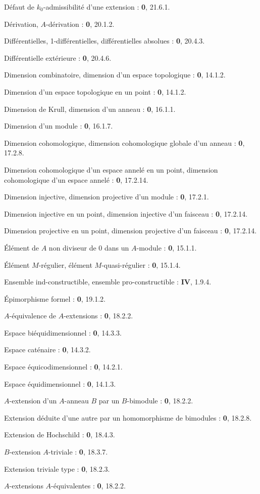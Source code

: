 Défaut de $k_0$-admissibilité d'une extension : \textbf{0}, 21.6.1.\par
Dérivation, $A$-dérivation : \textbf{0}, 20.1.2.\par
Différentielles, 1-différentielles, différentielles absolues : \textbf{0}, 20.4.3.\par
Différentielle extérieure : \textbf{0}, 20.4.6.\par
Dimension combinatoire, dimension d'un espace topologique : \textbf{0}, 14.1.2.\par
Dimension d'un espace topologique en un point : \textbf{0}, 14.1.2.\par
Dimension de Krull, dimension d'un anneau : \textbf{0}, 16.1.1.\par
Dimension d'un module : \textbf{0}, 16.1.7.\par
Dimension cohomologique, dimension cohomologique globale d'un anneau : \textbf{0}, 17.2.8.\par
Dimension cohomologique d'un espace annelé en un point, dimension cohomologique d'un espace annelé : \textbf{0}, 17.2.14.\par

\clearpage
{}
Dimension injective, dimension projective d'un module : \textbf{0}, 17.2.1.\par
Dimension injective en un point, dimension injective d'un faisceau : \textbf{0}, 17.2.14.\par
Dimension projective en un point, dimension projective d'un faisceau : \textbf{0}, 17.2.14.\par

Élément de $A$ non diviseur de 0 dans un $A$-module : \textbf{0}, 15.1.1.\par
Élément $M$-régulier, élément $M$-quasi-régulier : \textbf{0}, 15.1.4.\par
Ensemble ind-constructible, ensemble pro-constructible : \textbf{IV}, 1.9.4.\par
Épimorphisme formel : \textbf{0}, 19.1.2.\par
$A$-équivalence de $A$-extensions : \textbf{0}, 18.2.2.\par
Espace biéquidimensionnel : \textbf{0}, 14.3.3.\par
Espace caténaire : \textbf{0}, 14.3.2.\par
Espace équicodimensionnel : \textbf{0}, 14.2.1.\par
Espace équidimensionnel : \textbf{0}, 14.1.3.\par
$A$-extension d'un $A$-anneau $B$ par un $B$-bimodule : \textbf{0}, 18.2.2.\par
Extension déduite d'une autre par un homomorphisme de bimodules : \textbf{0}, 18.2.8.\par
Extension de Hochschild : \textbf{0}, 18.4.3.\par
$B$-extension $A$-triviale : \textbf{0}, 18.3.7.\par
Extension triviale type : \textbf{0}, 18.2.3.\par
$A$-extensions $A$-équivalentes : \textbf{0}, 18.2.2.\par

